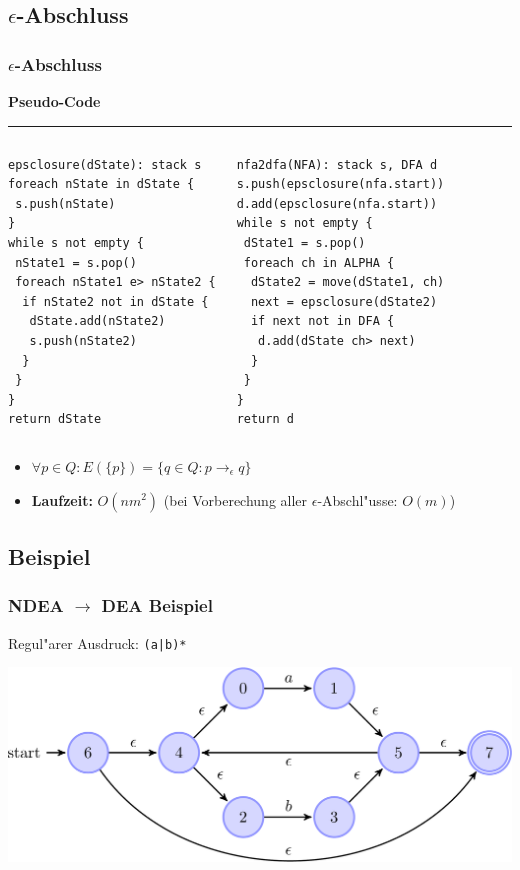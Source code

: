 \documentclass[ignorenonframetext]{beamer}
\begin{document}
\subsection{$\epsilon$-Abschluss}
\begin{frame}[fragile]
    \frametitle{$\epsilon$-Abschluss}
    
        \textbf{Pseudo-Code} 
        \hrule
        \begin{columns}
        \column{4.5cm}
\begin{lstlisting}
epsclosure(dState): stack s
foreach nState in dState {
 s.push(nState)
}
while s not empty { 
 nState1 = s.pop()
 foreach nState1 e> nState2 {
  if nState2 not in dState {
   dState.add(nState2)
   s.push(nState2)
  }
 }
}
return dState
\end{lstlisting}

        \column{4.3cm}
\begin{lstlisting}
nfa2dfa(NFA): stack s, DFA d
s.push(epsclosure(nfa.start))
d.add(epsclosure(nfa.start))
while s not empty {
 dState1 = s.pop()
 foreach ch in ALPHA {
  dState2 = move(dState1, ch)
  next = epsclosure(dState2)
  if next not in DFA {
   d.add(dState ch> next)
  }
 }
}
return d
\end{lstlisting}

        \end{columns}
\begin{itemize}
    \item $\forall p \in Q : E(\{p\}) = \{ q \in Q : p \rightarrow_\epsilon q \}$
    \item \textbf{Laufzeit:} $O(nm^2)$ (bei Vorberechung aller $\epsilon$-Abschl"usse: $O(m)$)  
\end{itemize}
\end{frame}


\subsection{Beispiel}
\begin{frame}[plain]
    \frametitle{NDEA $\rightarrow$ DEA Beispiel}
    
    Regul"arer Ausdruck: \texttt{(a|b)*}

    \begin{center}
        \includegraphics[scale=0.27]{aorbstar0.pdf}
    \end{center}
\end{frame}
\end{document}

